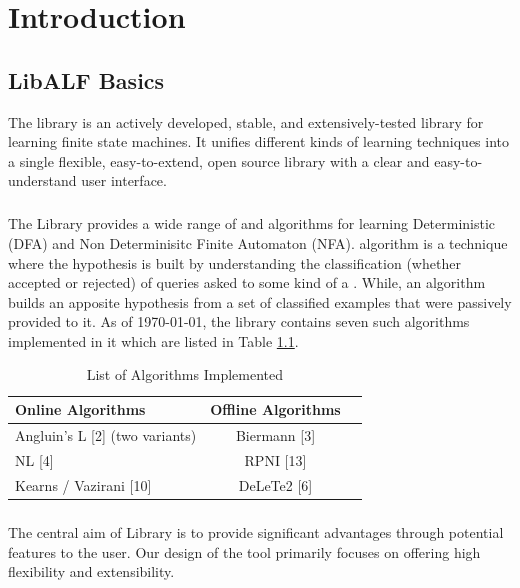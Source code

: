 
\chapter{Introduction}

\section{LibALF Basics}
		The \libalf library is an actively developed, stable, and extensively-tested library for learning finite state machines. It unifies different kinds of learning techniques into a single flexible, easy-to-extend, open source library with a clear and easy-to-understand user interface.
		\paragraph{}	
		The \libalf Library provides a wide range of \online and \offline algorithms for learning Deterministic (DFA) and Non Determinisitc Finite Automaton (NFA). \online algorithm is a technique where the hypothesis is built by understanding the classification (whether accepted or rejected) of queries asked to some kind of a \teacher.  While, an \offline algorithm builds an apposite hypothesis from a set of classified examples that were passively provided to it. As of \today, the library contains seven such algorithms implemented in it which are listed in Table \ref{algtables}.

		\begin{table}
		\centering
		\begin{tabular}[c]{lcr}
		\toprule[1pt]
			Online Algorithms & Offline Algorithms \\	
		\midrule
			Angluin's L [2] (two variants) & Biermann [3] \\
			NL [4] & RPNI [13] \\
			Kearns / Vazirani [10] & DeLeTe2 [6]\\
		\bottomrule[1pt]
		\end{tabular}
		\caption{List of Algorithms Implemented}
		\label{algtables}
		\end{table}
		
	  \paragraph{}	
		The central aim of \libalf Library is to provide significant advantages through potential features to the user. Our design of the tool primarily focuses on offering high flexibility and extensibility. 
